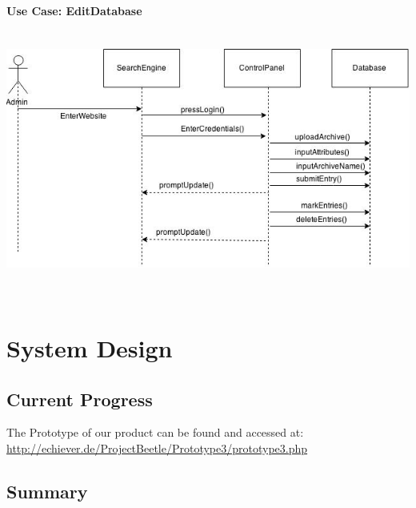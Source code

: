 \documentclass[12pt,a4paper]{article}
\begin{document}
{\bf Use Case: EditDatabase}\\

\includegraphics[height=92mm]{Sequence3.jpg}

\newpage

\section{System Design}
\subsection{Current Progress}

The Prototype of our product can be found and accessed at: \url{http://echiever.de/ProjectBeetle/Prototype3/prototype3.php}
\subsection{Summary}
\end{document}
